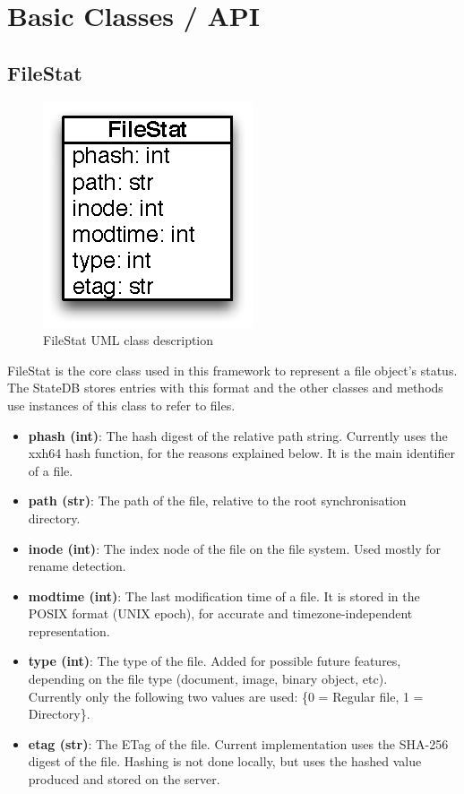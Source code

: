 \section{Basic Classes / API}
  \subsection{FileStat}
    \begin{figure}[!htpb]
      \centering
      \includegraphics{Images/FileStat.eps}
      \caption{FileStat UML class description}
      \label{fig:filestat_uml}
    \end{figure}
    FileStat is the core class used in this framework to represent a file object's status. The StateDB stores entries with this format and the other classes and methods use instances of this class to refer to files.
    \begin{itemize}
      \item \textbf{phash (int)}: The hash digest of the relative path string. Currently uses the xxh64 hash function, for the reasons explained below. It is the main identifier of a file.
      \item \textbf{path (str)}: The path of the file, relative to the root synchronisation directory.
      \item \textbf{inode (int)}: The index node of the file on the file system. Used mostly for rename detection.
      \item \textbf{modtime (int)}: The last modification time of a file. It is stored in the POSIX format (UNIX epoch), for accurate and timezone-independent representation.
      \item \textbf{type (int)}: The type of the file. Added for possible future features, depending on the file type (document, image, binary object, etc).\\
      Currently only the following two values are used: \{0 = Regular file, 1 = Directory\}.
      \item \textbf{etag (str)}: The ETag of the file. Current implementation uses the SHA-256 digest of the file. Hashing is not done locally, but uses the hashed value produced and stored on the server.
    \end{itemize}

